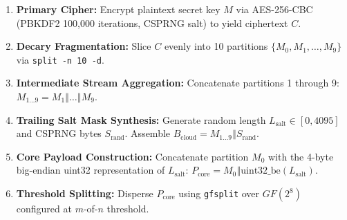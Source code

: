 \documentclass[11pt,a4paper,titlepage]{article}
\begin{document}
\begin{enumerate}
  \item \textbf{Primary Cipher:} Encrypt plaintext secret key $M$ via AES-256-CBC (PBKDF2 100,000 iterations, CSPRNG salt) to yield ciphertext $C$.
  \item \textbf{Decary Fragmentation:} Slice $C$ evenly into 10 partitions $\{M_0, M_1, \dots, M_9\}$ via \texttt{split -n 10 -d}.
  \item \textbf{Intermediate Stream Aggregation:} Concatenate partitions 1 through 9: $M_{1\dots9} = M_1 \mathbin{\Vert} \dots \mathbin{\Vert} M_9$.
  \item \textbf{Trailing Salt Mask Synthesis:} Generate random length $L_{\text{salt}} \in [0, 4095]$ and CSPRNG bytes $S_{\text{rand}}$. Assemble $B_{\text{cloud}} = M_{1\dots9} \mathbin{\Vert} S_{\text{rand}}$.
  \item \textbf{Core Payload Construction:} Concatenate partition $M_0$ with the 4-byte big-endian uint32 representation of $L_{\text{salt}}$: $P_{\text{core}} = M_0 \mathbin{\Vert} \text{uint32\_be}(L_{\text{salt}})$.
  \item \textbf{Threshold Splitting:} Disperse $P_{\text{core}}$ using \texttt{gfsplit} over $GF(2^8)$ configured at $m$-of-$n$ threshold.
\end{enumerate}
\fi
\end{document}

